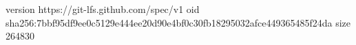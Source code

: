 version https://git-lfs.github.com/spec/v1
oid sha256:7bbf95df9ee0c5129e444ee20d90e4bf0c30fb18295032afce449365485f24da
size 264830
